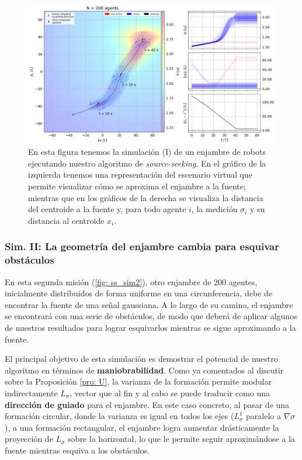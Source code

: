 \begin{figure}[!h]
\centering
\includegraphics[trim={0cm 0.0cm 0cm 0.0cm}, clip, width=1\columnwidth]{./fig/ss_sim1.png}
\caption{En esta figura tenemos la simulación (I) de un enjambre de robots ejecutando nuestro algoritmo de \textit{source-seeking}. En el gráfico de la izquierda tenemos una representación del escenario virtual que permite visualizar cómo se aproxima el enjambre a la fuente; mientras que en los gráficos de la derecha se visualiza la distancia del centroide a la fuente y, para todo agente $i$, la medición $\sigma_i$ y su distancia al centroide $x_i$.}
\label{fig: ss_sim1}
\end{figure}

\subsubsection*{Sim. II: La geometría del enjambre cambia para esquivar obstáculos}

En esta segunda misión (\autoref{fig: ss_sim2}), otro enjambre de 200 agentes, inicialmente distribuidos de forma uniforme en una circunferencia, debe de encontrar la fuente de una señal gaussiana. A lo largo de su camino, el enjambre se encontrará con una serie de obstáculos, de modo que deberá de aplicar algunos de nuestros resultados para lograr esquivarlos mientras se sigue aproximando a la fuente.

\newpage

El principal objetivo de esta simulación es demostrar el potencial de nuestro algoritmo en términos de \textbf{maniobrabilidad}. Como ya comentados al discutir sobre la Proposición \ref{pro: U}, la varianza de la formación permite modular indirectamente $L_\sigma$, vector que al fin y al cabo se puede traducir como una\textbf{ dirección de guiado} para el enjambre. En este caso concreto, al pasar de una formación circular, donde la varianza es igual en todos los ejes ($L_\sigma^1$ paralelo a $\nabla \sigma$), a una formación rectangular, el enjambre logra aumentar drásticamente la proyección de $L_\sigma$ sobre la horizontal, lo que le permite seguir aproximándose a la fuente mientras esquiva a los obstáculos.

